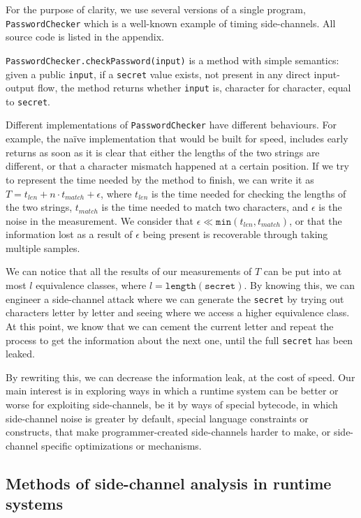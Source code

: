 \documentclass{article}
\begin{document}
For the purpose of clarity, we use several versions of a single program, \texttt{PasswordChecker}
which is a well-known example of timing side-channels. All source code is listed in the appendix.

\texttt{PasswordChecker.checkPassword(input)} is a method with simple semantics: given a public 
\texttt{input}, if a \texttt{secret} value exists, not present in any direct input-output flow, the 
method returns whether \texttt{input} is, character for character, equal to \texttt{secret}.

Different implementations of \texttt{PasswordChecker} have different behaviours. For example,
the na\"ive implementation that would be built for speed, includes early returns as soon as
it is clear that either the lengths of the two strings are different, or that a character
mismatch happened at a certain position. If we try to represent the time needed by the method
to finish, we can write it as $T = t_{len} + n\cdot t_{match} + \epsilon$, where $t_{len}$ is the time needed for
checking the lengths of the two strings, $t_{match}$ is the time needed to match two characters, and $\epsilon$ is the noise in the measurement. We consider that $\epsilon \ll \texttt{min}(t_{len}, t_{match})$, or that the information lost as a result of $\epsilon$ being present is recoverable through taking multiple samples.

We can notice that all the results of our measurements of $T$ can be put into at most $l$ equivalence classes, where $l = \texttt{length}(\texttt{secret})$. By knowing this, we can engineer a side-channel
attack where we can generate the \texttt{secret} by trying out characters letter by letter and seeing where
we access a higher equivalence class. At this point, we know that we can cement the current letter and repeat the process to get the information about the next one, until the full \texttt{secret} has been leaked.


By rewriting this, we can decrease the information leak, at the cost of speed. Our main interest is in
exploring ways in which a runtime system can be better or worse for exploiting side-channels, be it by
ways of special bytecode, in which side-channel noise is greater by default, special language constraints
or constructs, that make programmer-created side-channels harder to make, or side-channel specific optimizations or mechanisms.

\subsection{Methods of side-channel analysis in runtime systems}
\end{document}
